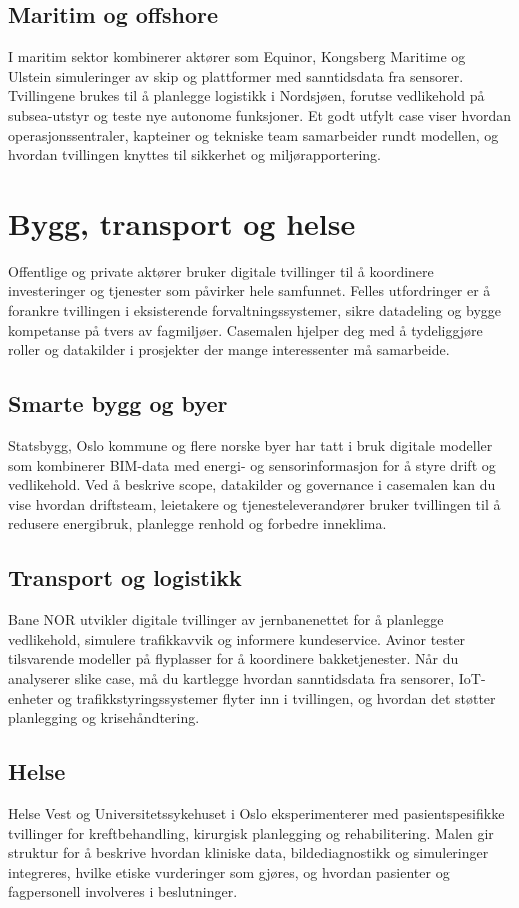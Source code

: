 \subsection*{Maritim og offshore}
I maritim sektor kombinerer aktører som Equinor, Kongsberg Maritime og Ulstein simuleringer av skip og plattformer med sanntidsdata fra sensorer. Tvillingene brukes til å planlegge logistikk i Nordsjøen, forutse vedlikehold på subsea-utstyr og teste nye autonome funksjoner. Et godt utfylt case viser hvordan operasjonssentraler, kapteiner og tekniske team samarbeider rundt modellen, og hvordan tvillingen knyttes til sikkerhet og miljørapportering.

\section{Bygg, transport og helse}
Offentlige og private aktører bruker digitale tvillinger til å koordinere investeringer og tjenester som påvirker hele samfunnet. Felles utfordringer er å forankre tvillingen i eksisterende forvaltningssystemer, sikre datadeling og bygge kompetanse på tvers av fagmiljøer. Casemalen hjelper deg med å tydeliggjøre roller og datakilder i prosjekter der mange interessenter må samarbeide.

\subsection*{Smarte bygg og byer}
Statsbygg, Oslo kommune og flere norske byer har tatt i bruk digitale modeller som kombinerer BIM-data med energi- og sensorinformasjon for å styre drift og vedlikehold. Ved å beskrive scope, datakilder og governance i casemalen kan du vise hvordan driftsteam, leietakere og tjenesteleverandører bruker tvillingen til å redusere energibruk, planlegge renhold og forbedre inneklima.

\subsection*{Transport og logistikk}
Bane NOR utvikler digitale tvillinger av jernbanenettet for å planlegge vedlikehold, simulere trafikkavvik og informere kundeservice. Avinor tester tilsvarende modeller på flyplasser for å koordinere bakketjenester. Når du analyserer slike case, må du kartlegge hvordan sanntidsdata fra sensorer, IoT-enheter og trafikkstyringssystemer flyter inn i tvillingen, og hvordan det støtter planlegging og krisehåndtering.

\subsection*{Helse}
Helse Vest og Universitetssykehuset i Oslo eksperimenterer med pasientspesifikke tvillinger for kreftbehandling, kirurgisk planlegging og rehabilitering. Malen gir struktur for å beskrive hvordan kliniske data, bildediagnostikk og simuleringer integreres, hvilke etiske vurderinger som gjøres, og hvordan pasienter og fagpersonell involveres i beslutninger.

